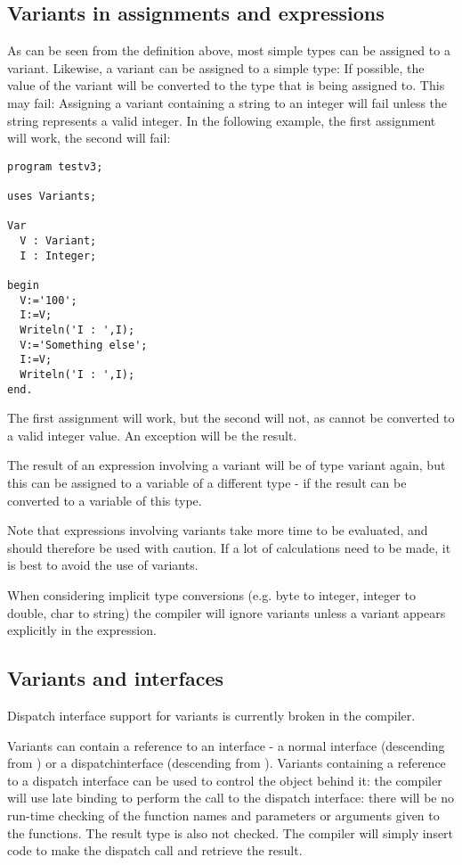 \subsection{Variants in assignments and expressions}
As can be seen from the definition above, most simple types can be assigned
to a variant. Likewise, a variant can be assigned to a simple type: If
possible, the value of the variant will be converted to the type that is
being assigned to. This may fail: Assigning a variant containing a string 
to an integer will fail unless the string represents a valid integer. In the
following example, the first assignment will work, the second will fail:
\begin{verbatim}
program testv3;

uses Variants;

Var
  V : Variant;
  I : Integer;

begin
  V:='100';
  I:=V;
  Writeln('I : ',I);
  V:='Something else';
  I:=V;
  Writeln('I : ',I);
end.
\end{verbatim}
The first assignment will work, but the second will not, as 
cannot be converted to a valid integer value. An  exception 
will be the result.

The result of an expression involving a variant will be of type variant again, 
but this can be assigned to a variable of a different type - if the result
can be converted to a variable of this type.

Note that expressions involving variants take more time to be evaluated, and
should therefore be used with caution. If a lot of calculations need to be
made, it is best to avoid the use of variants.

When considering implicit type conversions (e.g. byte to integer, integer to
double, char to string) the compiler will ignore variants unless a variant
appears explicitly in the expression. 
 
\subsection{Variants and interfaces}
\begin{remark}
Dispatch interface support for variants is currently broken in the compiler.
\end{remark}

Variants can contain a reference to an interface - a normal interface
(descending from ) or a dispatchinterface (descending 
from ). Variants containing a reference to a dispatch
interface can be used to control the object behind it: the compiler will use
late binding to perform the call to the dispatch interface: there will be no
run-time checking of the function names and parameters or arguments given to 
the functions. The result type is also not checked. The compiler will simply
insert code to make the dispatch call and retrieve the result. 

